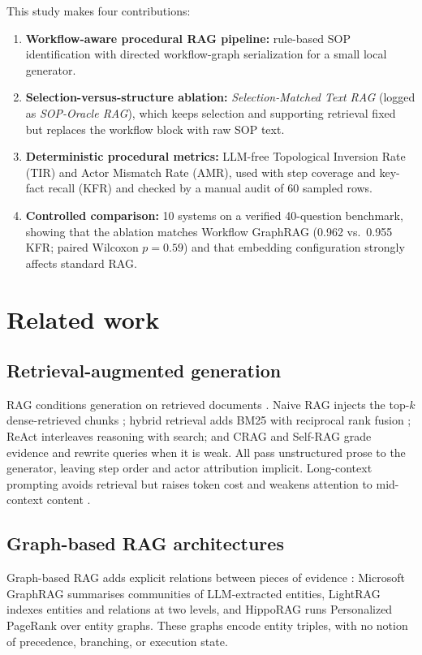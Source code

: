 \documentclass[a4paper,fleqn]{cas-dc}
\begin{document}
This study makes four contributions:
\begin{enumerate}[leftmargin=*]
\item \textbf{Workflow-aware procedural RAG pipeline:} rule-based SOP identification with directed workflow-graph serialization for a small local generator.
\item \textbf{Selection-versus-structure ablation:} \emph{Selection-Matched Text RAG} (logged as \emph{SOP-Oracle RAG}), which keeps selection and supporting retrieval fixed but replaces the workflow block with raw SOP text.
\item \textbf{Deterministic procedural metrics:} LLM-free Topological Inversion Rate (TIR) and Actor Mismatch Rate (AMR), used with step coverage and key-fact recall (KFR) and checked by a manual audit of 60 sampled rows.
\item \textbf{Controlled comparison:} 10 systems on a verified 40-question benchmark, showing that the ablation matches Workflow GraphRAG (0.962 vs.\ 0.955 KFR; paired Wilcoxon $p=0.59$) and that embedding configuration strongly affects standard RAG.
\end{enumerate}

\section{Related work}
\label{sec:related}

\subsection{Retrieval-augmented generation}
RAG conditions generation on retrieved documents \cite{lewis2020rag}. Naive RAG injects the top-$k$ dense-retrieved chunks \cite{gao2023ragsurvey}; hybrid retrieval adds BM25 \cite{robertson2009bm25} with reciprocal rank fusion \cite{cormack2009rrf}; ReAct \cite{yao2023react} interleaves reasoning with search; and CRAG \cite{yan2024crag} and Self-RAG \cite{asai2024selfrag} grade evidence and rewrite queries when it is weak. All pass unstructured prose to the generator, leaving step order and actor attribution implicit. Long-context prompting avoids retrieval but raises token cost and weakens attention to mid-context content \cite{liu2024lost}.

\subsection{Graph-based RAG architectures}
Graph-based RAG adds explicit relations between pieces of evidence \cite{peng2024graphragsurvey,pan2024unifying}: Microsoft GraphRAG \cite{edge2024graphrag} summarises communities of LLM-extracted entities, LightRAG \cite{guo2024lightrag} indexes entities and relations at two levels, and HippoRAG \cite{gutierrez2024hipporag} runs Personalized PageRank over entity graphs. These graphs encode entity triples, with no notion of precedence, branching, or execution state.
\end{document}
